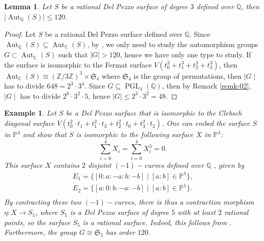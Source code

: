\documentclass[leqno,12pt]{amsart} %
\newtheorem{lem}[thm]{Lemma}
\newtheorem{ex}[thm]{Example}
\newcommand{\Z}{\ensuremath{\mathbb{Z}}}
\newcommand{\Q}{\ensuremath{\mathbb{Q} }}
\newcommand{\C}{\ensuremath{\mathbb{C} }}
\newcommand{\p}{\ensuremath{\mathbb{P} }}
\DeclareMathOperator{\PGL}{PGL}
\DeclareMathOperator{\Aut}{Aut}
\begin{document}
\begin{lem}\label{lemm-28}
    Let $S$ be a rational Del Pezzo surface of degree $3$ defined over $\Q $, then $\mid \Aut_{\Q }(S)\mid \le  120$.
\end{lem}
\begin{proof}
 Let $S$ be a rational Del Pezzo surface defined over $\Q$. Since $\Aut_{\Q}(S)\subseteq\Aut_{\C }(S)$, by \cite[Theorem 9.5.6]{MR2964027}, we only need to study the automorphism groups $G\subset\Aut_{\C}(S)$ such that $\mid G\mid > 120$, hence we have only one type to study. If the surface is isomorphic to the Fermat surface $V (t_0^3+ t_1^3+t_2^3+t_3^3)$, then $\Aut_{\C }(S)\cong (\Z /3\Z )^3\times \mathfrak{S}_4$ where $\mathfrak{S}_4$ is the group of permutations, then $\mid G\mid$ has to divide $648=2^3\cdot3^4$. Since $G\subseteq\PGL _4(\Q )$, then by Remark \ref{remk-02}, $\mid G\mid $ has to divide $2^6\cdot3^2\cdot5$, hence $\mid G\mid \le 2^3\cdot3^2=48$. 
\end{proof}
 
\begin{ex}\label{ex-02}
    Let $S$ be a Del Pezzo surface that is isomorphic to the Clebsch diagonal surface $V(t_0^2\cdot t_1+ t_1^2\cdot t_3+t_2^2\cdot t_0+t_3^2\cdot t_2)$. One can embed the surface $S$ in $\p^4$ and show that $S$ is isomorphic to the following surface $X$ in $\p^4$: 
    \[\sum_{i=0}^{4}X_{i}=\sum_{i=0}^{4}X_{i}^3=0.\]
    This surface  $X$ contains $2$ disjoint $(-1)-$curves defined over $\Q$ , given by
  \[ \begin{array}{l}
          E_1=\{[0:a:-a:b:-b]\mid [a:b]\in \p^1\},\\
        E_2=\{[a:0:b:-a:-b]\mid [a:b]\in \p^1\}.\\
    \end{array}\]
By contracting these two $(-1)-$curves, there is thus a contraction morphism $\eta: X\rightarrow S_5$, where $S_5$ is a Del Pezzo surface of degree $5$ with at least $2$ rational points, so the surface $S_5$ is a rational surface. Indeed, this follows from \cite[Theorem 3.15]{MR225780}. Furthermore, the group $G\cong\mathfrak{S}_5$ has order $120$.
\end{ex}
\end{document}
